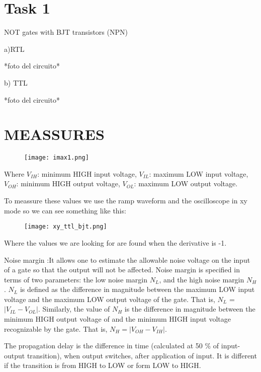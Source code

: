 \section*{Task 1}
NOT gates with BJT transistors (NPN)

a)RTL

*foto del circuito*

b) TTL

*foto del circuito*

\section*{MEASSURES}

\begin{figure}[H] 
\begin{center}
\texttt{[image: imax1.png]}
\end{center}
\caption{}
\label{fig:measures}
\end{figure} 

Where $V_{IH}$: minimum HIGH input voltage, $V_{IL}$: maximum LOW input voltage, $V_{OH}$: minimum HIGH output voltage, $V_{OL}$: maximum LOW output voltage.

To meassure these values we use the ramp waveform and the oscilloscope in xy mode so we can see something like this:
\begin{figure}[H] 
    \begin{center}
    \texttt{[image: xy\_ttl\_bjt.png]}
    \end{center}
    \caption{}
    \label{fig:measures}
    \end{figure}     
Where the values we are looking for are found when the derivative is -1.

Noise margin :It allows one to estimate the allowable noise voltage on the input of a 
gate so that the output will not be affected. Noise margin is specified
 in terms of two parameters: the low noise margin $N_{L}$, and the high noise 
 margin $N_{H}$ . $N_{L}$ is defined as the difference in magnitude
  between the maximum LOW input voltage and the maximum 
  LOW output voltage of the gate. That is, $N_{L}$ =$|V_{IL} - V_{OL}|$.
   Similarly, the value of $N_{H}$ is the difference in 
   magnitude between the minimum HIGH output voltage of 
   and the minimum HIGH input voltage recognizable by 
   the gate. That is, $N_{H} =|V_{OH} - V_{IH}|.$ 


The propagation delay  is the difference in time (calculated at 50
\% of input-output transition), when output switches, after 
application of input. It is different if the transition is
 from HIGH to LOW or form LOW to HIGH.

